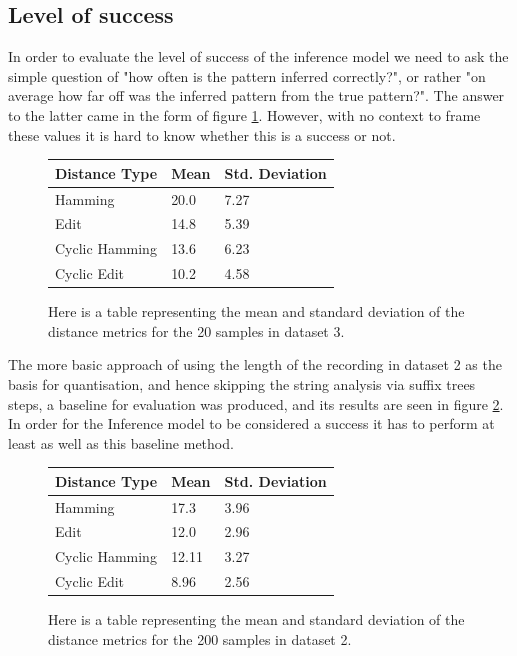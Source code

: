 \documentclass[12pt,twoside,notitlepage]{report}
\begin{document}
		\subsection{Level of success}
		In order to evaluate the level of success of the inference model we need to ask the simple question of "how often is the pattern inferred correctly?", or rather "on average how far off was the inferred pattern from the true pattern?". The answer to the latter came in the form of figure \ref{tab:RepeatMeans}. However, with no context to frame these values it is hard to know whether this is a success or not.
		\begin{figure}[]
						\begin{center}
							\begin{tabu} to 0.8\textwidth {|X[c] |X[c]|X[c]|}
							\hline
							 \textbf{Distance Type}& \textbf{Mean} & \textbf{Std. Deviation} \\
							 \hline
							 Hamming& 20.0 & 7.27 \\
							 \hline
							 Edit& 14.8 & 5.39 \\
							 \hline
							 Cyclic Hamming& 13.6 & 6.23\\
							 \hline
							 Cyclic Edit& 10.2 & 4.58 \\
							 \hline
							 \end{tabu}
						\end{center}
						\caption{\label{tab:RepeatMeans} Here is a table representing the mean and standard deviation of the distance metrics for the 20 samples in dataset 3.}
		
		\end{figure}
		
		The more basic approach of using the length of the recording in dataset 2 as the basis for quantisation, and hence skipping the string analysis via suffix trees steps, a baseline for evaluation was produced, and its results are seen in figure \ref{tab:Means}. In order for the Inference model to be considered a success it has to perform at least as well as this baseline method. 


\begin{figure}[]
						\begin{center}
							\begin{tabu} to 0.8\textwidth {|X[c] |X[c]|X[c]|}
							\hline
							 \textbf{Distance Type}& \textbf{Mean} & \textbf{Std. Deviation} \\
							 \hline
							 Hamming& 17.3 & 3.96 \\
							 \hline
							 Edit& 12.0 & 2.96 \\
							 \hline
							 Cyclic Hamming& 12.11 & 3.27\\
							 \hline
							 Cyclic Edit& 8.96 & 2.56 \\
							 \hline
							 \end{tabu}
						\end{center}
						\caption{\label{tab:Means} Here is a table representing the mean and standard deviation of the distance metrics for the 200 samples in dataset 2.}
		
		\end{figure}
		
\end{document}
